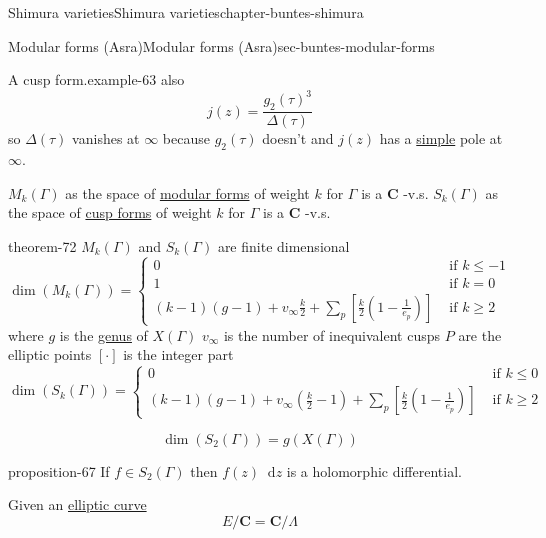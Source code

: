 \documentclass[oneside,10pt,]{book}
\numberwithin{equation}{section}
\newcommand{\diff}{\mathop{}\!\mathrm{d}}
\newcommand{\lb}{[}
\newcommand{\rb}{]}
\newcommand{\CC}{\mathbf{C}}
\newcommand{\amp}{&}
\begin{document}
\begin{chapterptx}{Shimura varieties}{}{Shimura varieties}{}{}{chapter-buntes-shimura}
\begin{sectionptx}{Modular forms (Asra)}{}{Modular forms (Asra)}{}{}{sec-buntes-modular-forms}
\begin{example}{A cusp form.}{example-63}
also%
\begin{equation*}
j(z) = \frac{g_2(\tau)^3}{\Delta(\tau)}
\end{equation*}
so \(\Delta(\tau)\) vanishes at \(\infty\) because \(g_2(\tau)\) doesn't  and \(j(z)\) has a  \hyperref[def-simple-av]{simple} pole at \(\infty\).%
\end{example}
\hypertarget{p-1067}{}%
\(M_k(\Gamma)\) as the space of \hyperref[def-buntes-mfs]{modular forms} of weight \(k\) for \(\Gamma\) is a \(\CC\) -v.s. \(S_k(\Gamma)\) as the space of \hyperref[def-buntes-cusp-forms]{cusp forms} of weight \(k\) for \(\Gamma\) is a \(\CC\) -v.s.%
\begin{theorem}{}{}{theorem-72}%
\hypertarget{p-1068}{}%
\(M_k(\Gamma)\) and \(S_k(\Gamma)\) are finite dimensional%
\begin{equation*}
\dim(M_k(\Gamma)) =
\begin{cases}
0 \amp \text{ if } k \le -1\\
1 \amp \text{ if } k = 0\\
(k-1)(g-1) + v_\infty \frac k2 + \sum_p [\frac k2 (1- \frac{1}{e_p})] \amp \text{ if } k \ge 2
\end{cases}
\end{equation*}
where \(g\) is the \hyperref[def-class-set]{genus} of \(X(\Gamma)\) \(v_\infty\) is the number of inequivalent cusps \(P\) are the elliptic points \(\lb \cdot \rb\) is the integer part%
\begin{equation*}
\dim(S_k(\Gamma)) =
\begin{cases}
0 \amp \text{ if } k \le 0 \\
(k-1)(g-1) + v_\infty (\frac k2 - 1) + \sum_p [\frac k2 (1- \frac{1}{e_p})] \amp \text{ if } k \ge 2
\end{cases}
\end{equation*}
%
\end{theorem}
\hypertarget{p-1069}{}%
%
\begin{equation*}
\dim(S_2(\Gamma)) = g(X(\Gamma))
\end{equation*}
%
\begin{proposition}{}{}{proposition-67}%
\hypertarget{p-1070}{}%
If \(f \in S_2(\Gamma)\) then \(f(z) \diff z\) is a holomorphic differential.%
\end{proposition}
\hypertarget{p-1071}{}%
Given an \hyperref[def-supersing-isog-ec]{elliptic curve}%
\begin{equation*}
E/  \CC = \CC/\Lambda
\end{equation*}
%
\begin{equation*}

\end{equation*}
\end{sectionptx}
\end{chapterptx}
\end{document}
